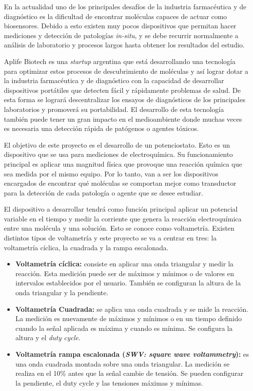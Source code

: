 \documentclass[11pt]{charter}
\begin{document}
En la actualidad uno de los principales desafíos de la industria farmacéutica y de diagnóstico es la dificultad de encontrar moléculas capaces de actuar como biosensores. Debido a esto existen muy pocos dispositivos que permitan hacer mediciones y detección de patologías \textit{in-situ}, y se debe recurrir normalmente a análisis de laboratorio y procesos largos hasta obtener los resultados del estudio. 

Aplife Biotech es una \textit{startup} argentina que está desarrollando una tecnología para optimizar estos procesos de descubrimiento de moléculas y así lograr dotar a la industria farmacéutica y de diagnóstico con la capacidad de desarrollar dispositivos portátiles que detecten fácil y rápidamente problemas de salud. De esta forma se logrará descentralizar los ensayos de diagnósticos de los principales laboratorios y promoverá su portabilidad. El desarrollo de esta tecnología también puede tener un gran impacto en el medioambiente donde muchas veces es necesaria una detección rápida de patógenos o agentes tóxicos.

El objetivo de este proyecto es el desarrollo de un potenciostato. Esto es un dispositivo que se usa para mediciones de electroquímica. Su funcionamiento principal es aplicar una magnitud física que provoque una reacción química que sea medida por el mismo equipo. Por lo tanto, van a ser los dispositivos encargados de encontrar qué moléculas se comportan mejor como transductor para la detección de cada patología o agente que se desee estudiar. 

El dispositivo a desarrollar tendrá como función principal aplicar un potencial variable en el tiempo y medir la corriente que genera la reacción electroquímica entre una molécula y una solución. Esto se conoce como voltametría. Existen distintos tipos de voltametría y este proyecto se va a centrar en tres: la voltametría cíclica, la cuadrada y la rampa escalonada.
\begin{itemize}
\item \textbf{Voltametría cíclica:} consiste en aplicar una onda triangular y medir la reacción. Esta medición puede ser de máximos y mínimos o de valores en intervalos establecidos por el usuario. También se configuran la altura de la onda triangular y la pendiente.
\item \textbf{Voltametría Cuadrada:} se aplica una onda cuadrada y se mide la reacción. La medición es nuevamente de máximos y mínimos o en un tiempo definido cuando la señal aplicada es máxima y cuando es mínima. Se configura la altura y el \textit{duty cycle}.
\item \textbf{Voltametría rampa escalonada (\textit{SWV: square wave voltammetry}):} es una onda cuadrada montada sobre una onda triangular. La medición se realiza en el 10\% antes que la señal cambie de tensión. Se pueden configurar la pendiente, el duty cycle y las tensiones máximas y mínimas. 
\end{itemize}
\end{document}
